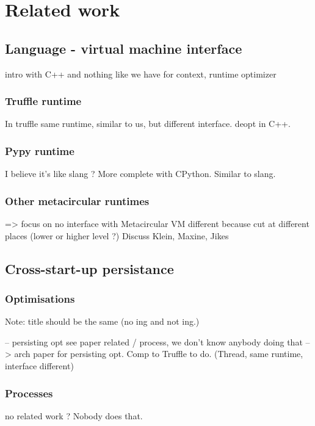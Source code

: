 \documentclass[a4paper,12pt,twoside]{../includes/ThesisStyle}
\begin{document}
\fi

\chapter{Related work}
\label{chap:comparison}
\minitoc

\section{Language - virtual machine interface}

intro with C++ and nothing like we have for context, runtime optimizer

\subsection{Truffle runtime}
In truffle same runtime, similar to us, but different interface. deopt in C++. 


\subsection{Pypy runtime}
I believe it's like slang ? More complete with CPython. Similar to slang.

\subsection{Other metacircular runtimes}

=> focus on no interface with Metacircular VM
different because cut at different places (lower or higher level ?)
Discuss Klein, Maxine, Jikes

\section{Cross-start-up persistance}

\subsection{Optimisations}
Note: title should be the same (no ing and not ing.)

-- persisting opt see paper related / process, we don't know anybody doing that
--> arch paper for persisting opt. Comp to Truffle to do. (Thread, same runtime, interface different)

\subsection{Processes}

no related work ?
Nobody does that.

\ifx\wholebook\relax\else
    
\end{document}
